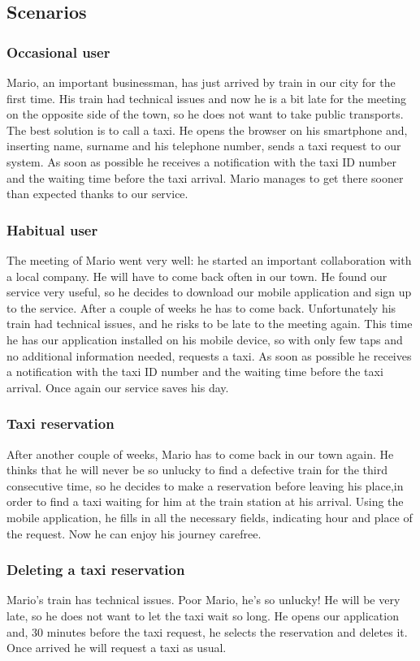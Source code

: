 	\subsection{Scenarios}
		\subsubsection{Occasional user}
			Mario, an important businessman, has just arrived by train in our city for the first time.
			His train had technical issues and now he is a bit late for the meeting on 
			the opposite side of the town, so he does not want to take public transports.
			The best solution is to call a taxi.
			He opens the browser on his smartphone and, inserting name, surname and his telephone number, sends a taxi request
			to our system. As soon as possible he receives a notification with the taxi ID number and the
			waiting time before the taxi arrival. Mario manages to get there sooner than expected thanks to our service.
		\subsubsection{Habitual user}
			The meeting of Mario went very well: he started an important collaboration with a local
			company. He will have to come back often in our town. He found our service very useful, so
			he decides to download our mobile application and sign up to the service. After a couple of weeks he has to
			come back. Unfortunately his train had technical issues, and he risks to be late to the
			meeting again. This time he has our application installed on his mobile device, so with only
			few taps and no additional information needed, requests a taxi. As soon as possible he receives
			a notification with the taxi ID number and the	waiting time before the taxi arrival.
			Once again our service saves his day.
		\subsubsection{Taxi reservation}
			After another couple of weeks, Mario has to come back in our town again. He thinks that he 
			will never be so unlucky to find a defective train for the third consecutive time,
			so he decides to make a reservation before leaving his place,in order to find a taxi waiting for him
			at the train station at his arrival. Using the mobile application, he fills in all the
			necessary fields, indicating hour and place of the request.
			Now he can enjoy his journey carefree.
		\subsubsection{Deleting a taxi reservation}
			Mario's train has technical issues. Poor Mario, he's so unlucky! He will be very late, 
			so he does not want to let the taxi wait so long. He opens our application and, 30 minutes
			before the taxi request, he selects the reservation and deletes it. Once arrived he will
			request a taxi as usual.
